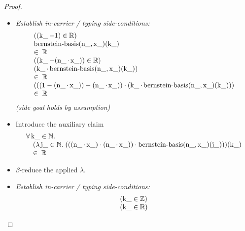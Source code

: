 \documentclass[11pt]{article}
\theoremstyle{plain}
\begin{document}
\begin{proof}
\begin{itemize}[leftmargin=2.8em, itemsep=4pt, parsep=1pt]
  \item[\textbf{47--52}] \emph{Establish in-carrier / typing side-conditions:}
\begin{equation*}
\begin{array}{@{}l@{}}
((\operatorname{k\_} - 1) \in \mathbb{R}) \\
\begin{array}{@{}l@{}} \operatorname{bernstein\text{-}basis}(\operatorname{n\_}, \operatorname{x\_})(\operatorname{k\_}) \\ \in\; \mathbb{R} \end{array} \\
((\operatorname{k\_} - (\operatorname{n\_} \cdot \operatorname{x\_})) \in \mathbb{R}) \\
\begin{array}{@{}l@{}} (\operatorname{k\_} \cdot \operatorname{bernstein\text{-}basis}(\operatorname{n\_}, \operatorname{x\_})(\operatorname{k\_})) \\ \in\; \mathbb{R} \end{array} \\
\begin{array}{@{}l@{}} (((1 - (\operatorname{n\_} \cdot \operatorname{x\_})) - (\operatorname{n\_} \cdot \operatorname{x\_})) \cdot (\operatorname{k\_} \cdot \operatorname{bernstein\text{-}basis}(\operatorname{n\_}, \operatorname{x\_})(\operatorname{k\_}))) \\ \in\; \mathbb{R} \end{array}
\end{array}
\end{equation*}
  \emph{(side goal holds by assumption)}
  \item[\textbf{53}] Introduce the auxiliary claim
\begin{equation*}
\begin{array}{@{}l@{}} \forall \operatorname{k\_} \in \mathbb{N}. \\ \quad (\lambda \operatorname{j\_} \in \mathbb{N}.\; (((\operatorname{n\_} \cdot \operatorname{x\_}) \cdot (\operatorname{n\_} \cdot \operatorname{x\_})) \cdot \operatorname{bernstein\text{-}basis}(\operatorname{n\_}, \operatorname{x\_})(\operatorname{j\_})))(\operatorname{k\_}) \\ \quad \in\; \mathbb{R} \end{array}
\end{equation*}

  \item[\textbf{54--55}] $\beta$-reduce the applied $\lambda$.
  \item[\textbf{56--57}] \emph{Establish in-carrier / typing side-conditions:}
\begin{equation*}
\begin{array}{@{}l@{}}
(\operatorname{k\_} \in \mathbb{Z}) \\
(\operatorname{k\_} \in \mathbb{R})
\end{array}
\end{equation*}


\end{itemize}
\end{proof}
\end{document}
